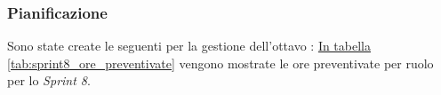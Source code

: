 \subsubsection{Pianificazione}
\label{sec:sprint8_pianificazione}
Sono state create le seguenti  per la gestione dell'ottavo : 
\hyperref[tab:sprint8_ore_preventivate]{In tabella \ref{tab:sprint8_ore_preventivate}} vengono mostrate le ore preventivate per ruolo per lo \textit{Sprint 8}.

\begin{table}[H]
    \centering
    \caption{Ore preventivate per ruolo Sprint 8}
    \label{tab:sprint8_ore_preventivate}
\end{table}